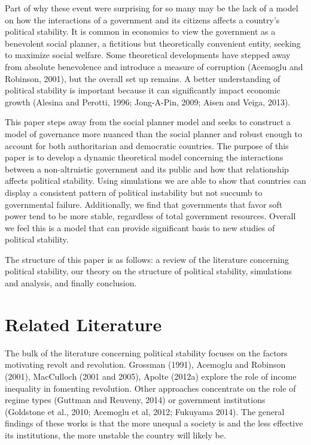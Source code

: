 \documentclass[12pt]{article}
\begin{document}
\begin{spacing}{1.5}
Part of why these event were surprising for so many may be the lack of a model on how the interactions of a government and its citizens affects a country's political stability. It is common in economics to view the government as a benevolent social planner, a fictitious but theoretically convenient entity, seeking to maximize social welfare. Some theoretical developments have stepped away from absolute benevolence and introduce a measure of corruption (Acemoglu and Robinson, 2001), but the overall set up remains. A better understanding of political stability is important because it can significantly impact economic growth (Alesina and Perotti, 1996; Jong-A-Pin, 2009; Aisen and Veiga, 2013).

This paper steps away from the social planner model and seeks to construct a model of governance more nuanced than the social planner and robust enough to account for both authoritarian and democratic countries. The purpose of this paper is to develop a dynamic theoretical model concerning the interactions between a non-altruistic government and its public and how that relationship affects political stability. Using simulations we are able to show that countries can display a consistent pattern of political instability but not succumb to governmental failure. Additionally, we find that governments that favor soft power tend to be more stable, regardless of total government resources. Overall we feel this is a model that can provide significant basis to new studies of political stability.  
  
The structure of this paper is as follows: a review of the literature concerning political stability, our theory on the structure of political stability, simulations and analysis, and finally conclusion.    

\section{Related Literature}

The bulk of the literature concerning political stability focuses on the factors motivating revolt and revolution. Grossman (1991), Acemoglu and Robinson (2001), MacCulloch (2001 and 2005), Apolte (2012a) explore the role of income inequality in fomenting revolution. Other approaches concentrate on the role of regime types (Guttman and Reuveny, 2014) or government institutions (Goldstone et al., 2010; Acemoglu et al, 2012; Fukuyama 2014). The general findings of these works is that the more unequal a society is and the less effective its institutions, the more unstable the country will likely be. 


\end{spacing}
\end{document}
